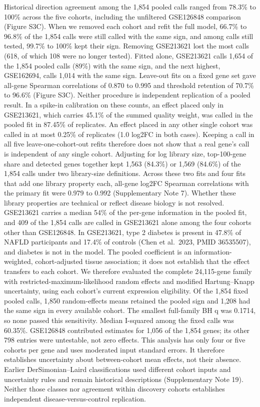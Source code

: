 Historical direction agreement among the 1,854 pooled calls ranged from 78.3\% to 100\% across the five cohorts, including the unfiltered GSE126848 comparison (Figure S3C). When we removed each cohort and refit the full model, 66.7\% to 96.8\% of the 1,854 calls were still called with the same sign, and among calls still tested, 99.7\% to 100\% kept their sign. Removing GSE213621 lost the most calls (618, of which 108 were no longer tested). Fitted alone, GSE213621 calls 1,654 of the 1,854 pooled calls (89\%) with the same sign, and the next highest, GSE162694, calls 1,014 with the same sign. Leave-out fits on a fixed gene set gave all-gene Spearman correlations of 0.870 to 0.995 and threshold retention of 70.7\% to 96.6\% (Figure S3C). Neither procedure is independent replication of a pooled result. In a spike-in calibration on these counts, an effect placed only in GSE213621, which carries 45.1\% of the summed quality weight, was called in the pooled fit in 87.45\% of replicates. An effect placed in any other single cohort was called in at most 0.25\% of replicates (1.0 log2FC in both cases). Keeping a call in all five leave-one-cohort-out refits therefore does not show that a real gene's call is independent of any single cohort. Adjusting for log library size, top-100-gene share and detected genes together kept 1,563 (84.3\%) or 1,569 (84.6\%) of the 1,854 calls under two library-size definitions. Across these two fits and four fits that add one library property each, all-gene log2FC Spearman correlations with the primary fit were 0.979 to 0.992 (Supplementary Note 7). Whether these library properties are technical or reflect disease biology is not resolved. GSE213621 carries a median 54\% of the per-gene information in the pooled fit, and 409 of the 1,854 calls are called in GSE213621 alone among the four cohorts other than GSE126848. In GSE213621, type 2 diabetes is present in 47.8\% of NAFLD participants and 17.4\% of controls (Chen et al.~2023, PMID 36535507), and diabetes is not in the model. The pooled coefficient is an information-weighted, cohort-adjusted tissue association; it does not establish that the effect transfers to each cohort. We therefore evaluated the complete 24,115-gene family with restricted-maximum-likelihood random effects and modified Hartung--Knapp uncertainty, using each cohort's current expression eligibility. Of the 1,854 fixed pooled calls, 1,850 random-effects means retained the pooled sign and 1,208 had the same sign in every available cohort. The smallest full-family BH q was 0.1714, so none passed this sensitivity. Median I-squared among the fixed calls was 60.35\%. GSE126848 contributed estimates for 1,056 of the 1,854 genes; its other 798 entries were untestable, not zero effects. This analysis has only four or five cohorts per gene and uses moderated input standard errors. It therefore establishes uncertainty about between-cohort mean effects, not their absence. Earlier DerSimonian--Laird classifications used different cohort inputs and uncertainty rules and remain historical descriptions (Supplementary Note 19). Neither those classes nor agreement within discovery cohorts establishes independent disease-versus-control replication.


